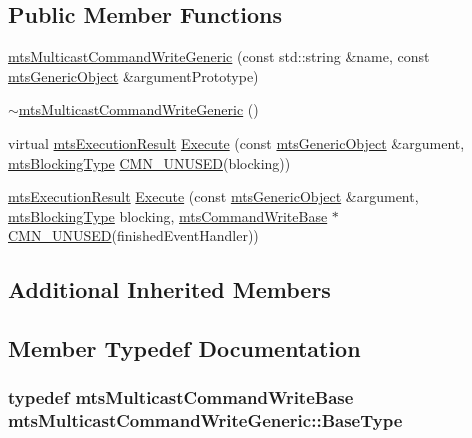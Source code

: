 \subsection*{Public Member Functions}
\begin{DoxyCompactItemize}
\item 
\hyperlink{classmts_multicast_command_write_generic_a0dfaa78a4f3b696f30c16a9c91621a56}{mts\-Multicast\-Command\-Write\-Generic} (const std\-::string \&name, const \hyperlink{classmts_generic_object}{mts\-Generic\-Object} \&argument\-Prototype)
\item 
\hyperlink{classmts_multicast_command_write_generic_a57c99817ece859e07be08243dff7f70e}{$\sim$mts\-Multicast\-Command\-Write\-Generic} ()
\item 
virtual \hyperlink{classmts_execution_result}{mts\-Execution\-Result} \hyperlink{classmts_multicast_command_write_generic_adef62d44a0e2fc7c05d92d67356b25ab}{Execute} (const \hyperlink{classmts_generic_object}{mts\-Generic\-Object} \&argument, \hyperlink{mts_forward_declarations_8h_ad7426ccb6c883bc780d0ee197dddcbe7}{mts\-Blocking\-Type} \hyperlink{cmn_portability_8h_a021894e2626935fa2305434b1e893ff6}{C\-M\-N\-\_\-\-U\-N\-U\-S\-E\-D}(blocking))
\item 
\hyperlink{classmts_execution_result}{mts\-Execution\-Result} \hyperlink{classmts_multicast_command_write_generic_ac0d9b6b578959511ddc197c38b3d05e4}{Execute} (const \hyperlink{classmts_generic_object}{mts\-Generic\-Object} \&argument, \hyperlink{mts_forward_declarations_8h_ad7426ccb6c883bc780d0ee197dddcbe7}{mts\-Blocking\-Type} blocking, \hyperlink{classmts_command_write_base}{mts\-Command\-Write\-Base} $\ast$\hyperlink{cmn_portability_8h_a021894e2626935fa2305434b1e893ff6}{C\-M\-N\-\_\-\-U\-N\-U\-S\-E\-D}(finished\-Event\-Handler))
\end{DoxyCompactItemize}
\subsection*{Additional Inherited Members}


\subsection{Member Typedef Documentation}
\hypertarget{classmts_multicast_command_write_generic_ad9b380aee1bd7519d91697092a045bf9}{
\subsubsection[{Base\-Type}]{\setlength{\rightskip}{0pt plus 5cm}typedef {\bf mts\-Multicast\-Command\-Write\-Base} {\bf mts\-Multicast\-Command\-Write\-Generic\-::\-Base\-Type}}}\label{classmts_multicast_command_write_generic_ad9b380aee1bd7519d91697092a045bf9}


